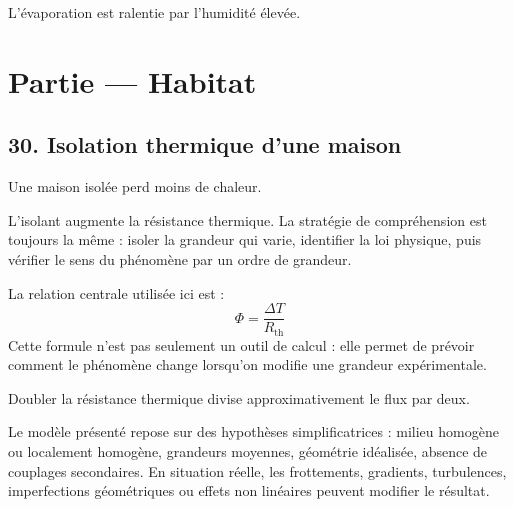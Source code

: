 \documentclass[11pt,a4paper]{article}
\begin{document}
\begin{corrigebox}[Indication]
L'évaporation est ralentie par l'humidité élevée.
\end{corrigebox}


\section{Partie — Habitat}


\subsection{30. Isolation thermique d'une maison}

\begin{exemplebox}
Une maison isolée perd moins de chaleur.
\end{exemplebox}

\begin{methodebox}
L'isolant augmente la résistance thermique.
La stratégie de compréhension est toujours la même : isoler la grandeur qui varie, identifier la loi physique, puis vérifier le sens du phénomène par un ordre de grandeur.
\end{methodebox}

\begin{theorembox}
La relation centrale utilisée ici est :
\[
\Phi=\frac{\Delta T}{R_{\mathrm{th}}}
\]
Cette formule n'est pas seulement un outil de calcul : elle permet de prévoir comment le phénomène change lorsqu'on modifie une grandeur expérimentale.
\end{theorembox}

\begin{odgbox}
Doubler la résistance thermique divise approximativement le flux par deux.
\end{odgbox}

\begin{attentionbox}
Le modèle présenté repose sur des hypothèses simplificatrices : milieu homogène ou localement homogène, grandeurs moyennes, géométrie idéalisée, absence de couplages secondaires. En situation réelle, les frottements, gradients, turbulences, imperfections géométriques ou effets non linéaires peuvent modifier le résultat.
\end{attentionbox}
\end{document}
